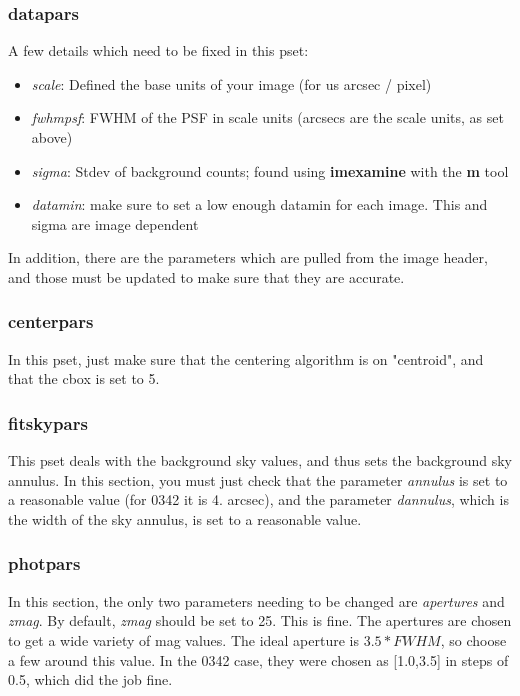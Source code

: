 \documentclass[a4paper]{article}
\begin{document}
\subsubsection{datapars}
A few details which need to be fixed in this pset:
\begin{itemize}
\item \textit{scale}: Defined the base units of your image (for us arcsec / pixel)
\item \textit{fwhmpsf}: FWHM of the PSF in scale units (arcsecs are the scale units, as set above)
\item \textit{sigma}: Stdev of background counts; found using \textbf{imexamine} with the \textbf{m} tool
\item \textit{datamin}: make sure to set a low enough datamin for each image.  This and sigma are image dependent
\end{itemize}
In addition, there are the parameters which are pulled from the image header, and those must be updated to make sure that they are accurate.
\subsubsection{centerpars}
In this pset, just make sure that the centering algorithm is on "centroid", and that the cbox is set to 5.
\subsubsection{fitskypars}
This pset deals with the background sky values, and thus sets the background sky annulus.  In this section, you must just check that the parameter \textit{annulus} is set to a reasonable value (for 0342 it is 4. arcsec), and the parameter \textit{dannulus}, which is the width of the sky annulus, is set to a reasonable value.
\subsubsection{photpars}
In this section, the only two parameters needing to be changed are \textit{apertures} and \textit{zmag}.  By default, \textit{zmag} should be set to 25.  This is fine.  The apertures are chosen to get a wide variety of mag values.  The ideal aperture is $3.5 * FWHM$, so choose a few around this value.  In the 0342 case, they were chosen as [1.0,3.5] in steps of 0.5, which did the job fine.
\end{document}
